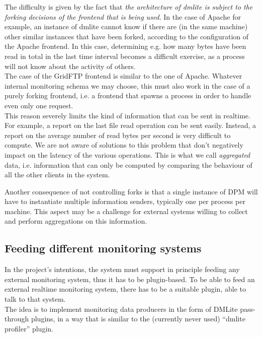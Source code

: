 \documentclass[12pt]{article} %
\begin{document}
The difficulty is given by the fact that \textit{the architecture of dmlite is subject to the forking decisions of the frontend that is being used}. In the case of Apache for example, an instance of dmlite cannot know if there are (in the same machine) other similar instances that have been forked, according to the configuration of the Apache frontend. In this case, determining e.g. how many bytes have been read in total in the last time interval becomes a difficult exercise, as a process will not know about the activity of others.\\

The case of the GridFTP frontend is similar to the one of Apache. Whatever internal monitoring schema we may choose, this must also work in the case of a purely forking frontend, i.e. a frontend that spawns a process in order to handle even only one request.\\

This reason severely limits the kind of information that can be sent in realtime. For example, a report on the last file read operation can be sent easily. Instead, a report on the average number of read bytes per second is very difficult to compute. We are not aware of solutions to this problem that don't negatively impact on the latency of the various operations. This is what we call \textit{aggregated} data, i.e. information that can only be computed by comparing the behaviour of all the other clients in the system.

Another consequence of not controlling forks is that a single instance of DPM will have to instantiate multiple information senders, typically one per process per machine. This aspect may be a challenge for external systems willing to collect and perform aggregations on this information.

\subsection{\label{feeding}Feeding different monitoring systems}

In the project's intentions, the system must support in principle feeding any external monitoring system, thus it has to be plugin-based. To be able to feed an external realtime monitoring system, there has to be a suitable plugin, able to talk to that system.\\
The idea is to implement monitoring data producers in the form of DMLite pass-through plugins, in a way that is similar to the (currently never used) ``dmlite profiler'' plugin.\\
\end{document}
